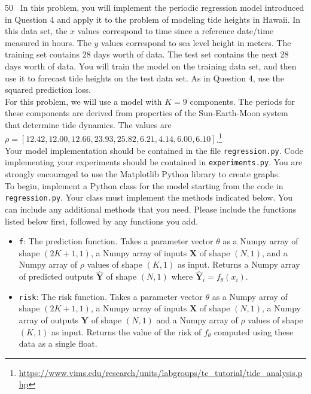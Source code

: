 \documentclass[11pt]{article}
\newcommand{\mbf}[1]{{\mathbf{#1}}}
\begin{document}
\begin{problem}{50} ~In this problem, you will implement the periodic regression model introduced in Question 4 and apply it to the problem of modeling tide heights in Hawaii. In this data set, the $x$ values correspond to time since a reference date/time measured in hours. The $y$ values correspond to sea level height in meters. The training set contains 28 days worth of data. The test set contains the next 28 days worth of data. You will train the model on the training data set, and then use it to forecast tide heights on the test data set. As in Question 4, use the squared prediction loss. \\

For this problem, we will use a model with $K=9$ components. The periods for these components are derived from properties of the Sun-Earth-Moon system that determine tide dynamics. The values are $\rho=[12.42, 12.00, 12.66, 23.93, 25.82, 6.21, 4.14, 6.00, 6.10]$.\footnote{\url{https://www.vims.edu/research/units/labgroups/tc_tutorial/tide_analysis.php}}\\

Your model implementation should be contained in the file \verb|regression.py|. Code implementing your experiments should be contained in  \verb|experiments.py|. You are strongly encouraged to use the Matplotlib Python library to create graphs. \\
    
To begin, implement a Python class for the model starting from the code in \verb|regression.py|. Your class must implement the methods indicated below. You can include any additional methods that you need. Please include the functions listed below first, followed by any functions you add. 
    
\begin{itemize}
        \item \verb|f|: The prediction function. Takes a parameter vector $\theta$ as a Numpy array of shape $(2K+1,1)$, a Numpy array of inputs $\mbf{X}$ of shape $(N, 1)$, and a Numpy array of $\rho$ values of shape $(K,1)$ as input. Returns a Numpy array of predicted outputs $\hat{\mbf{Y}}$ of shape $(N, 1)$ where $\hat{\mbf{Y}}_i=f_{\theta}(x_i)$. 
        
        \item \verb|risk|: The risk function. Takes a parameter vector $\theta$ as a Numpy array of shape $(2K+1,1)$, a Numpy array of inputs $\mbf{X}$ of shape $(N, 1)$, a Numpy array of outputs $\mbf{Y}$ of shape $(N, 1)$ and a Numpy array of $\rho$ values of shape $(K,1)$ as input. Returns the value of the risk of $f_{\theta}$ computed using these data as a single float. 
        

\end{itemize}
\end{problem}
\end{document}
